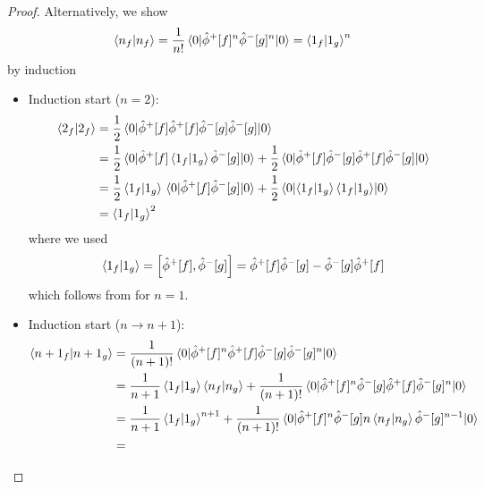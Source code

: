 \begin{proof}
	Alternatively, we show
	\begin{equation*}
		\braket{n_f}{n_f}
		=
		\frac{1}{n!}
		\expval{
			\hat\phi^+[f]^n
			\hat\phi^-[g]^n
		}{0}
		=
		\braket{1_f}{1_g}^n
	\end{equation*}
	 by induction
	\begin{itemize}
		\item Induction start ($n=2$):
		\begin{equation*}
			\begin{split}
				\braket{2_f}
				&=
				\frac{1}{2}
				\expval{
					\hat\phi^+[f]
					\hat\phi^+[f]
					\hat\phi^-[g]
					\hat\phi^-[g]
				}{0}
				\\
				&=
				\frac{1}{2}
				\expval{
					\hat\phi^+[f]
					\braket{1_f}{1_g}
					\hat\phi^-[g]
				}{0}
				+
				\frac{1}{2}
				\expval{
					\hat\phi^+[f]
					\hat\phi^-[g]
					\hat\phi^+[f]
					\hat\phi^-[g]
				}{0}
				\\
				&=
				\frac{1}{2}
				\braket{1_f}{1_g}
				\expval{
					\hat\phi^+[f]
					\hat\phi^-[g]
				}{0}
				+
				\frac{1}{2}
				\expval{
					\braket{1_f}{1_g}
					\braket{1_f}{1_g}
				}{0}
				\\
				&=
				\braket{1_f}{1_g}^2
			\end{split}
		\end{equation*}
		where we used
		\begin{equation*}
			\braket{1_f}{1_g}
			=
			\comm{\hat\phi^+[f]}{\hat\phi^-[g]}
			=
			\hat\phi^+[f]
			\hat\phi^-[g]
			-
			\hat\phi^-[g]
			\hat\phi^+[f]
		\end{equation*}
		which follows from  for $n=1$.
		\item Induction start ($n\to n+1$):
		\begin{equation*}
			\begin{split}
				\braket{n+1_f}{n+1_g}
				&=
				\frac{1}{(n+1)!}
				\expval{
					\hat\phi^+[f]^n
					\hat\phi^+[f]
					\hat\phi^-[g]
					\hat\phi^-[g]^n
				}{0}
				\\
				&=
				\frac{1}{n+1}
				\braket{1_f}{1_g}
				\braket{n_f}{n_g}
				+
				\frac{1}{(n+1)!}
				\expval{
					\hat\phi^+[f]^n
					\hat\phi^-[g]
					\hat\phi^+[f]
					\hat\phi^-[g]^n
				}{0}
				\\
				&=
				\frac{1}{n+1}
				\braket{1_f}{1_g}^{n+1}
				+
				\frac{1}{(n+1)!}
				\expval{
					\hat\phi^+[f]^n
					\hat\phi^-[g]
					n
					\braket{n_f}{n_g}
					\hat\phi^-[g]^{n-1}
				}{0}
				\\
				&=

\end{split}
\end{equation*}
\end{itemize}
\end{proof}
